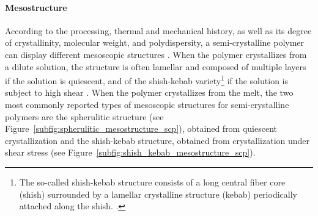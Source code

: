 \paragraph{Mesostructure}
According to the processing, thermal and mechanical history, as well as its degree of crystallinity, molecular weight, and polydispersity, a semi-crystalline polymer can display different mesoscopic structures \citep{cangemiTwoPhaseModelMechanical2001, mandelkernCrystallinePolymerReminiscences2006}.
When the polymer crystallizes from a dilute solution, the structure is often lamellar and composed of multiple layers if the solution is quiescent, and of the shish-kebab variety\footnote{The so-called shish-kebab structure consists of a long central fiber core (shish) surrounded by a lamellar crystalline structure (kebab) periodically attached along the shish.
\citep{naViscousForceDominatedTensileDeformation2006, peacockHandbookPolyethyleneStructures2014}.} if the solution is subject to high shear \citep{khouryMorphologyCrystallineSynthetic1976, callister2014materials, peacockHandbookPolyethyleneStructures2014}.
When the polymer crystallizes from the melt, the two most commonly reported types of mesoscopic structures for semi-crystalline polymers are the spherulitic structure \citep{zengConstitutiveModelSemicrystalline2010} (see Figure~\ref{subfig:spherulitic_mesostructure_scp}), obtained from quiescent crystallization and the shish-kebab structure, obtained from crystallization under shear stress \citep{peacockHandbookPolyethyleneStructures2014} (see Figure~\ref{subfig:shish_kebab_mesostructure_scp}).
